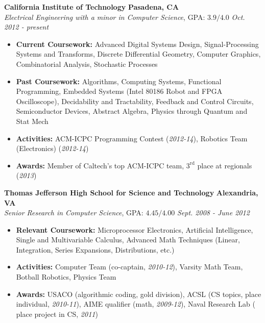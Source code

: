 \documentclass{article}
\newenvironment{changemargin}[2]{%
  \begin{list}{}{%
    \setlength{\topsep}{0pt}%
    \setlength{\leftmargin}{#1}%
    \setlength{\rightmargin}{#2}%
    \setlength{\listparindent}{\parindent}%
    \setlength{\itemindent}{\parindent}%
    \setlength{\parsep}{\parskip}%
  }%
  \item[]}{\end{list}
}
\newenvironment{body} {
	\vspace*{-16pt}
	\begin{changemargin}{-0.25in}{-0.5in}
  }	
	{\end{changemargin}
}
\begin{document}
\begin{body}
	\vspace{14pt}
	\textbf{California Institute of Technology} \hfill \textbf{Pasadena, CA}{} \\
	\emph{Electrical Engineering with a minor in Computer Science}, GPA: $3.9/4.0$ \hfill \emph{Oct. 2012 - present} \\
	\begin{itemize}
	\item \textbf{Current Coursework:} Advanced Digital Systems Design, Signal-Processing Systems and Transforms, Discrete Differential Geometry, Computer Graphics, Combinatorial Analysis, Stochastic Processes
	\item \textbf{Past Coursework:} Algorithms, Computing Systems, Functional Programming, Embedded Systems (Intel 80186 Robot and FPGA Oscilloscope), Decidability and Tractability, Feedback and Control Circuits, Semiconductor Devices, Abstract Algebra, Physics through Quantum and Stat Mech
	\item \textbf{Activities:} ACM-ICPC Programming Contest (\textit{2012-14}), Robotics Team (Electronics) (\textit{2012-14})
	\item \textbf{Awards:} Member of Caltech's top ACM-ICPC team, $3^\text{rd}$ place at regionals (\textit{2013})
	\end{itemize}

	\medskip

	\textbf{Thomas Jefferson High School for Science and Technology} \hfill \textbf{Alexandria, VA} \\
	\emph{Senior Research in Computer Science}, GPA: $4.45/4.00$ \hfill \emph{Sept. 2008 - June 2012} \\
	\begin{itemize}
	\item \textbf{Relevant Coursework:} Microprocessor Electronics, Artificial Intelligence, Single and Multivariable Calculus, Advanced Math Techniques (Linear, Integration, Series Expansions, Distributions, etc.)
	\item \textbf{Activities:} Computer Team (co-captain, \textit{2010-12}), Varsity Math Team, Botball Robotics, Physics Team
	\item \textbf{Awards:} USACO (algorithmic coding, gold division), ACSL (CS topics,  place individual, \textit{2010-11}), AIME qualifier (math, \textit{2009-12}), Naval Research Lab ( place project in CS, \textit{2011})
	\end{itemize}
\end{body}
\end{document}
